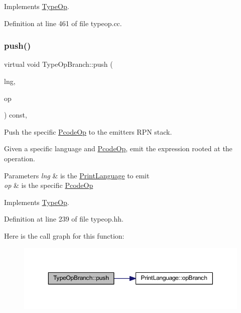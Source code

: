 Implements \mbox{\hyperlink{class_type_op_a60717e486917a30cc7cb6e3ce02585e1}{Type\+Op}}.



Definition at line 461 of file typeop.\+cc.

\mbox{\label{class_type_op_branch_ac4bf4ae638f9fb5be2521ec278df072b}} 
\subsubsection{\texorpdfstring{push()}{push()}}
{\footnotesize\ttfamily virtual void Type\+Op\+Branch\+::push (\begin{DoxyParamCaption}\item[{\mbox{\hyperlink{class_print_language}{Print\+Language}} $\ast$}]{lng,  }\item[{const \mbox{\hyperlink{class_pcode_op}{Pcode\+Op}} $\ast$}]{op }\end{DoxyParamCaption}) const\hspace{0.3cm}{\ttfamily [inline]}, {\ttfamily [virtual]}}



Push the specific \mbox{\hyperlink{class_pcode_op}{Pcode\+Op}} to the emitter\textquotesingle{}s R\+PN stack. 

Given a specific language and \mbox{\hyperlink{class_pcode_op}{Pcode\+Op}}, emit the expression rooted at the operation. 
\begin{DoxyParams}{Parameters}
{\em lng} & is the \mbox{\hyperlink{class_print_language}{Print\+Language}} to emit \\
\hline
{\em op} & is the specific \mbox{\hyperlink{class_pcode_op}{Pcode\+Op}} \\
\hline
\end{DoxyParams}


Implements \mbox{\hyperlink{class_type_op_ac9c9544203ed74dabe6ac662b653b2af}{Type\+Op}}.



Definition at line 239 of file typeop.\+hh.

Here is the call graph for this function\+:
\nopagebreak
\begin{figure}[H]
\begin{center}
\leavevmode
\includegraphics[width=350pt]{class_type_op_branch_ac4bf4ae638f9fb5be2521ec278df072b_cgraph}
\end{center}
\end{figure}


